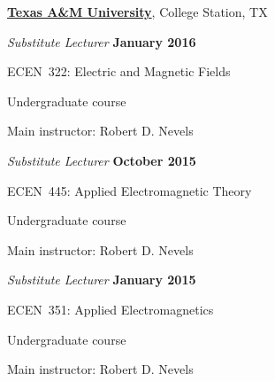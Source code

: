 \documentclass[10pt]{article}
\newcommand{\halfblankline}{\quad\vspace{-0.5\baselineskip}\pagebreak[3]}
\begin{document}
\href{http://www.tamu.edu/}{\textbf{Texas A\&M University}},
College Station, TX
\begin{outerlist}

\item[] \textit{Substitute Lecturer} \hfill \textbf{January 2016}
    \begin{innerlist}
        \item ECEN~322: Electric and Magnetic Fields
        \begin{innerlist}
            \item Undergraduate course
            \item Main instructor: Robert D. Nevels
        \end{innerlist}
    \end{innerlist}

\item[] \textit{Substitute Lecturer} \hfill \textbf{October 2015}
    \begin{innerlist}
        \item ECEN~445: Applied Electromagnetic Theory
        \begin{innerlist}
            \item Undergraduate course
            \item Main instructor: Robert D. Nevels
        \end{innerlist}
    \end{innerlist}

\item[] \textit{Substitute Lecturer} \hfill \textbf{January 2015}
    \begin{innerlist}
        \item ECEN~351: Applied Electromagnetics
        \begin{innerlist}
            \item Undergraduate course
            \item Main instructor: Robert D. Nevels
        \end{innerlist}
    \end{innerlist}

\end{outerlist}

\halfblankline
\end{document}
